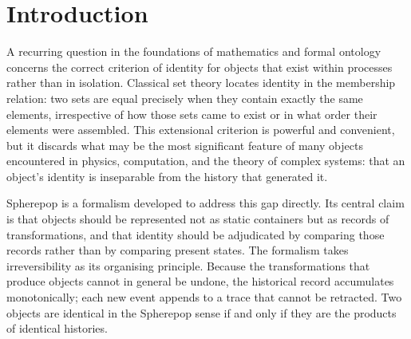 \documentclass[12pt]{article}
\theoremstyle{plain}
\theoremstyle{definition}
\theoremstyle{remark}
\newcommand{\Collapse}{\mathbf{Collapse}}
\newcommand{\PathCat}{\mathbb{P}(\Omega)}
\begin{document}
\begin{abstract}
The two movements are unified by a categorical diagram relating the trajectory
category $\mathcal{T}$, the Free History Category $\PathCat$, and the
category of observable states $\mathcal{S}$, with projections $\Pi_{\mathrm{hist}}$
and $\Collapse$ connecting the three levels and neither admitting a right
inverse.  The Worldhood Theorem characterises when a system genuinely inhabits
this structure---when it performs irreversible commitments for which it bears
non-zero responsibility---as opposed to simulating it from a fixed option space.
A discrete variational principle then provides the generative law: realised
trajectories extremize an action functional that balances entropy, responsibility,
and coherence, giving the history of an object the status of an optimal
trajectory, not merely a recorded one.  The essay concludes by placing this
framework in contrast with the set-theoretic ontology it replaces: from
membership to commitment, from static equivalence to irreversible construction,
from objects defined by their contents to processes defined by what they have
made impossible.
\end{abstract}

\vspace{0.8em}
\tableofcontents
\newpage
\section{Introduction}
\label{sec:introduction}

A recurring question in the foundations of mathematics and formal ontology
concerns the correct criterion of identity for objects that exist within
processes rather than in isolation.  Classical set theory locates identity in
the membership relation: two sets are equal precisely when they contain exactly
the same elements, irrespective of how those sets came to exist or in what
order their elements were assembled.  This extensional criterion is powerful
and convenient, but it discards what may be the most significant feature of
many objects encountered in physics, computation, and the theory of complex
systems: that an object's identity is inseparable from the history that
generated it.

Spherepop is a formalism developed to address this gap directly.  Its central
claim is that objects should be represented not as static containers but as
records of transformations, and that identity should be adjudicated by comparing
those records rather than by comparing present states.  The formalism takes
irreversibility as its organising principle.  Because the transformations that
produce objects cannot in general be undone, the historical record accumulates
monotonically; each new event appends to a trace that cannot be retracted.  Two
objects are identical in the Spherepop sense if and only if they are the products
of identical histories.
\end{document}
